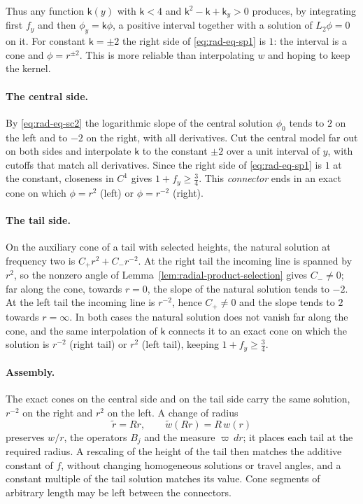 Thus any function $\mathsf k(y)$ with $\mathsf k<4$ and
$\mathsf k^2-\mathsf k+\mathsf k_y>0$ produces, by integrating first
$f_y$ and then $\phi_y=\mathsf k\phi$, a positive interval together
with a solution of $L_2\phi=0$ on it. For constant $\mathsf k=\pm2$
the right side of \eqref{eq:rad-eq-sp1} is $1$: the interval is a
cone and $\phi=r^{\pm2}$. This is more reliable than interpolating
$w$ and hoping to keep the kernel.

\paragraph{The central side.}
By \eqref{eq:rad-eq-sc2} the logarithmic slope of the central solution
$\phi_0$ tends to $2$ on the left and to $-2$ on the right, with all
derivatives. Cut the central model far out on both sides and
interpolate $\mathsf k$ to the constant $\pm2$ over a unit interval of
$y$, with cutoffs that match all derivatives. Since the right side of
\eqref{eq:rad-eq-sp1} is $1$ at the constant, closeness in $C^1$ gives
$1+f_y\ge\tfrac34$. This \emph{connector} ends in an exact cone on
which $\phi=r^{2}$ (left) or $\phi=r^{-2}$ (right).

\paragraph{The tail side.}
On the auxiliary cone of a tail with selected heights, the natural
solution at frequency two is $C_+r^2+C_-r^{-2}$. At the right tail the
incoming line is spanned by $r^2$, so the nonzero angle of
Lemma~\ref{lem:radial-product-selection} gives $C_-\ne0$; far along
the cone, towards $r=0$, the slope of the natural solution tends to
$-2$. At the left tail the incoming line is $r^{-2}$, hence $C_+\ne0$
and the slope tends to $2$ towards $r=\infty$. In both cases the
natural solution does not vanish far along the cone, and the same
interpolation of $\mathsf k$ connects it to an exact cone on which the
solution is $r^{-2}$ (right tail) or $r^{2}$ (left tail), keeping
$1+f_y\ge\tfrac34$.

\paragraph{Assembly.}
The exact cones on the central side and on the tail side carry the
same solution, $r^{-2}$ on the right and $r^{2}$ on the left. A change
of radius
\begin{equation}\label{eq:rad-eq-ha1}
 \widetilde r=Rr,\qquad \widetilde w(Rr)=R\,w(r)
\end{equation}
preserves $w/r$, the operators $B_j$ and the measure $\varpi\,dr$; it
places each tail at the required radius. A rescaling of the height of
the tail then matches the additive constant of $f$, without changing
homogeneous solutions or travel angles, and a constant multiple of the
tail solution matches its value. Cone segments of arbitrary length may
be left between the connectors.

